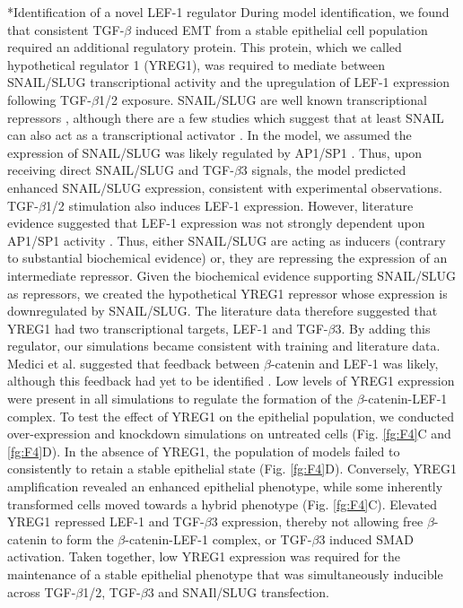 \documentclass[12pt]{article}
\makeatletter
\renewcommand\subsection{\@startsection
	{subsection}{2}{0mm}
	{-0.05in}
	{-0.5\baselineskip}
	{\normalfont\normalsize\bfseries}}
\makeatother
\begin{document}
\subsection*{Identification of a novel LEF-1 regulator}
During model identification, we found that consistent TGF-$\beta$ induced EMT from a stable epithelial cell population required an additional regulatory protein.
This protein, which we called hypothetical regulator 1 (YREG1), was required to mediate between SNAIL/SLUG transcriptional activity
and the upregulation of LEF-1 expression following TGF-$\beta$1/2 exposure.
SNAIL/SLUG are well known transcriptional repressors \citep{Hemavathy:2000aa,Hemavathy:2000ab,Dhasarathy:2011aa}, although there are a few studies
which suggest that at least SNAIL can also act as a transcriptional activator \citep{Guaita:2002aa}.
In the model, we assumed the expression of SNAIL/SLUG was likely regulated by AP1/SP1 \citep{Jackstadt:2013aa}.
Thus, upon receiving direct SNAIL/SLUG and TGF-$\beta$3 signals, the model predicted enhanced SNAIL/SLUG expression, consistent with experimental observations.
TGF-$\beta$1/2 stimulation also induces LEF-1 expression. However, literature evidence suggested that LEF-1 expression was not strongly dependent upon AP1/SP1 activity \citep{Eastman:1999aa}.
Thus, either SNAIL/SLUG are acting as inducers (contrary to substantial biochemical evidence) or, they are repressing the expression of an intermediate repressor.
Given the biochemical evidence supporting SNAIL/SLUG as repressors, we created the hypothetical YREG1 repressor whose
expression is downregulated by SNAIL/SLUG. The literature data therefore suggested that YREG1 had two transcriptional targets, LEF-1 and TGF-$\beta$3.
By adding this regulator, our simulations became consistent with training and literature data.
Medici et al. suggested that feedback between $\beta$-catenin and LEF-1 was likely, although this feedback had yet to be identified \citep{Medici:2008fk}.
Low levels of YREG1 expression were present in all simulations to regulate the formation of the $\beta$-catenin-LEF-1 complex.
To test the effect of YREG1 on the epithelial population, we conducted over-expression and knockdown simulations on untreated cells (Fig. \ref{fg:F4}C and \ref{fg:F4}D).
In the absence of YREG1, the population of models failed to consistently to retain a stable epithelial state (Fig. \ref{fg:F4}D).
Conversely, YREG1 amplification revealed an enhanced epithelial phenotype, while some inherently transformed cells moved towards a hybrid phenotype  (Fig. \ref{fg:F4}C).
Elevated YREG1 repressed LEF-1 and TGF-$\beta$3 expression, thereby not allowing free $\beta$-catenin to form the $\beta$-catenin-LEF-1 complex, or TGF-$\beta$3 induced SMAD activation.
Taken together, low YREG1 expression was required for the maintenance of a stable epithelial phenotype that was simultaneously inducible across TGF-$\beta$1/2, TGF-$\beta$3 and SNAIl/SLUG transfection.
\end{document}
